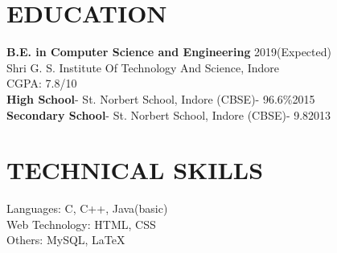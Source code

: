 \documentclass[line, margin]{res}
\begin{document}
\address{\href{mailto: sajal.agrawal1997@gmail.com}{sajal.agrawal1997@gmail.com}\\ +918878155869}
\begin{resume}

\section{EDUCATION}
\textbf{B.E. in Computer Science and Engineering} \hfill 2019(Expected)\\
Shri G. S. Institute Of Technology And Science, Indore\\
CGPA: 7.8/10\\
\textbf{High School}- St. Norbert School, Indore (CBSE)- 96.6\%\hfill 2015\\
\textbf{Secondary School}- St. Norbert School, Indore (CBSE)- 9.8\hfill 2013\\

\section{TECHNICAL SKILLS}
Languages: C, C++, Java(basic)\\
Web Technology: HTML, CSS\\
Others: MySQL, \LaTeX\\


\end{resume}
\end{document}
